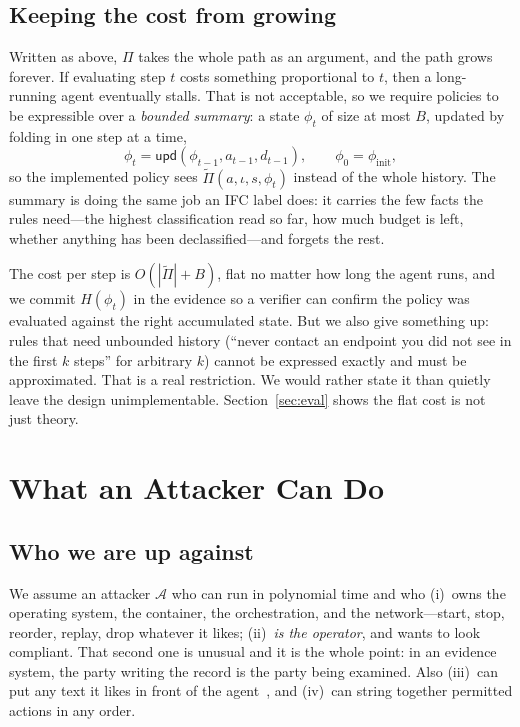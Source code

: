 \documentclass[11pt]{article}
\begin{document}
\subsection{Keeping the cost from growing}
\label{sec:complexity}

Written as above, $\Pi$ takes the whole path as an argument, and the path
grows forever. If evaluating step $t$ costs something proportional to $t$,
then a long-running agent eventually stalls. That is not acceptable, so we
require policies to be expressible over a \emph{bounded summary}: a state
$\phi_t$ of size at most $B$, updated by folding in one step at a time,
\begin{equation}
\phi_t = \mathsf{upd}(\phi_{t-1}, a_{t-1}, d_{t-1}), \qquad
\phi_0 = \phi_{\mathrm{init}},
\end{equation}
so the implemented policy sees $\tilde{\Pi}(a, \iota, s, \phi_t)$ instead of
the whole history. The summary is doing the same job an IFC label does: it
carries the few facts the rules need---the highest classification read so far,
how much budget is left, whether anything has been declassified---and forgets
the rest.

The cost per step is $O(|\tilde{\Pi}| + B)$, flat no matter
how long the agent runs, and we commit $H(\phi_t)$ in the evidence so a
verifier can confirm the policy was evaluated against the right accumulated
state. But we also give something up: rules that need unbounded history
(``never contact an endpoint you did not see in the first $k$ steps'' for
arbitrary $k$) cannot be expressed exactly and must be approximated. That is a
real restriction. We would rather state it than quietly leave the design
unimplementable. Section~\ref{sec:eval} shows the flat cost is not just theory.

\section{What an Attacker Can Do}
\label{sec:security}

\subsection{Who we are up against}
We assume an attacker $\mathcal{A}$ who can run in polynomial time and who
(i)~owns the operating system, the container, the orchestration, and the
network---start, stop, reorder, replay, drop whatever it likes; (ii)~\emph{is
the operator}, and wants to look compliant. That second one is unusual and it
is the whole point: in an evidence system, the party writing the record is the
party being examined. Also (iii)~can put any text it likes in front of the
agent~\cite{greshake2023,injecagent}, and (iv)~can string together permitted
actions in any order.
\end{document}

